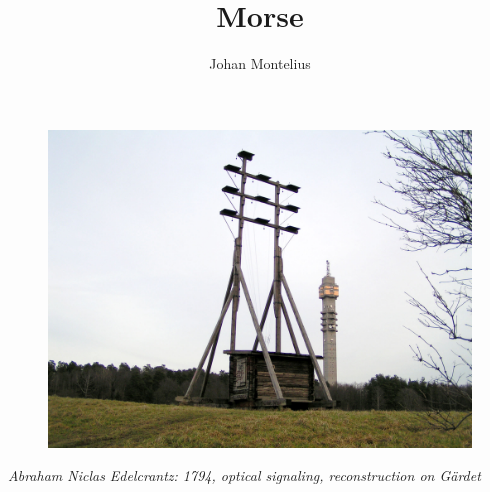 

\title[ID1019 Morse coding]{Morse}


\author{Johan Montelius}
\date{\semester}





\begin{frame}
\titlepage
\end{frame}


\begin{frame}

  \begin{figure}
    \center
    \includegraphics[scale=0.1]{gardet.jpg}
  \end{figure}

  \vspace{10pt}\pause
  {\em Abraham Niclas Edelcrantz: 1794, optical signaling, reconstruction on Gärdet}
  
\end{frame}


